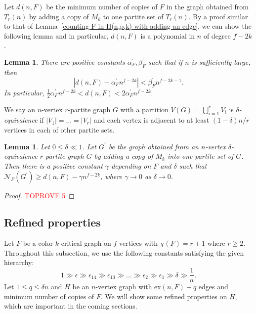 \documentclass[10pt]{article}
\newtheorem{lemma}[theorem]{Lemma}
\begin{document}
Let $d(n,F)$ be the minimum number of copies of $F$ in the graph obtained from $T_r(n)$ by adding a copy of $M_k$ to one partite set of $T_r(n)$.
By a proof similar to that of Lemma~\ref{counting F in H(n,p,k) with adding an edge},
we can show the following lemma and in particular, $d(n,F)$ is a polynomial in $n$ of degree $f-2k$.

\begin{lemma}\label{counting F in Tp(n) with adding a matching}
 There are positive constants $\alpha^\prime_F,\beta^\prime_F$ such that if $n$ is sufficiently large, then
$$|d(n,F)-\alpha^\prime_F n^{f-2k}|<\beta^\prime_F n ^{f-2k-1}.$$
In particular, $\frac{1}{2}\alpha^\prime_F n^{f-2k} <d(n,F)<2\alpha^\prime_F n^{f-2k}.$
\end{lemma}

We say an $n$-vertex $r$-partite graph $G$ with a partition $V(G)=\bigcup_{i=1}^{r}V_i$ is {\it $\delta$-equivalence}
 if $|V_1|=\ldots=|V_r|$ and each vertex is adjacent to at least $(1-\delta)n/r$ vertices in each of other partite sets.

\begin{lemma}\label{couting F in near complete graph within a mathing}
Let $0\leq\delta\ll1$. Let $G^\prime$ be the graph obtained from an $n$-vertex $\delta$-equivalence $r$-partite graph $G$ by adding a copy of $M_k$ into one partite set of $G$.
Then there is a positive constant $\gamma$ depending on $F$ and $\delta$ such that
$\mathcal{N}_F(G^\prime)\geq d(n,F)-\gamma n^{f-2k}$, where $\gamma\to 0$ as $\delta\to 0$.
\end{lemma}
\begin{proof}\textcolor{red}{TOPROVE 5}\end{proof}


\subsection{Refined properties}\label{subsec:refined}
Let $F$ be a color-$k$-critical graph on $f$ vertices with $\chi(F)=r+1$ where $r\geq 2$.
Throughout this subsection, we use the following constants satisfying the given hierarchy:
$$ 1\gg\epsilon\gg\epsilon_{14}\gg  \epsilon_{13}\gg\ldots\gg\epsilon_2 \gg\epsilon_1\gg\delta \gg\frac{1}{n}.$$
Let $1\leq q\leq \delta n$ and $H$ be an $n$-vertex graph with ex$(n,F)+q$ edges and minimum number of copies of $F$.
We will show some refined properties on $H$, which are important in the coming sections.
\end{document}
